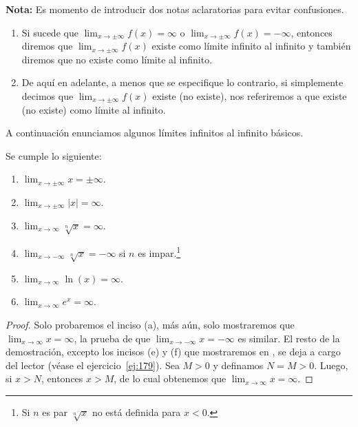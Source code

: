 \documentclass[12pt,a4paper]{book}
\begin{document}
    \textbf{Nota:} Es momento de introducir dos notas aclaratorias para evitar
    confusiones.
    \begin{enumerate}[label=\arabic*.,nosep]
        \item Si sucede que $\lim_{x\to\pm\infty}f(x)=\infty$ o $\lim_{x\to\pm\infty}f(x)=-\infty$, entonces
        diremos que $\lim_{x\to\pm\infty}f(x)$ existe como límite infinito al infinito y también
        diremos que no existe como límite al infinito.
        \item De aquí en adelante, a menos que se especifique lo contrario, si simplemente
        decimos que $\lim_{x\to\pm\infty}f(x)$ existe (no existe), nos referiremos a que existe
        (no existe) como límite al infinito.
    \end{enumerate}

    A continuación enunciamos algunos límites infinitos al infinito básicos.

    \begin{proposicion}\label{prop:51}
        Se cumple lo
        siguiente:
        \begin{enumerate}[nosep]
            \item $\displaystyle\lim_{x\to\pm\infty}x=\pm\infty$.
            \item $\displaystyle\lim_{x\to\pm\infty}|x|=\infty$.
            \item $\displaystyle\lim_{x\to\infty}\sqrt[n]{x}=\infty$.
            \item $\displaystyle\lim_{x\to-\infty}\sqrt[n]{x}=-\infty$ si $n$ es impar.\footnote{Si $n$ es par $\sqrt[n]{x}$ no está definida para $x<0$.}
            \item $\displaystyle\lim_{x\to\infty}\ln(x)=\infty$.
            \item $\displaystyle\lim_{x\to\infty}e^{x}=\infty$.
        \end{enumerate}
    \end{proposicion}

    \begin{proof}
        Solo probaremos el inciso (a), más aún, solo mostraremos que
        $\lim_{x\to\infty}x=\infty$, la prueba de que $\lim_{x\to-\infty}x=-\infty$ es similar. El resto de la
        demostración, excepto los incisos (e) y (f) que mostraremos en \cite{nunez2020calculoII}, se deja a
        cargo del lector (véase el ejercicio~\ref{ej:179}). Sea $M>0$ y definamos $N=M>0$.
        Luego, si $x>N$, entonces $x>M$, de lo cual obtenemos que $\lim_{x\to\infty}x=\infty$.
    \end{proof}
\end{document}

